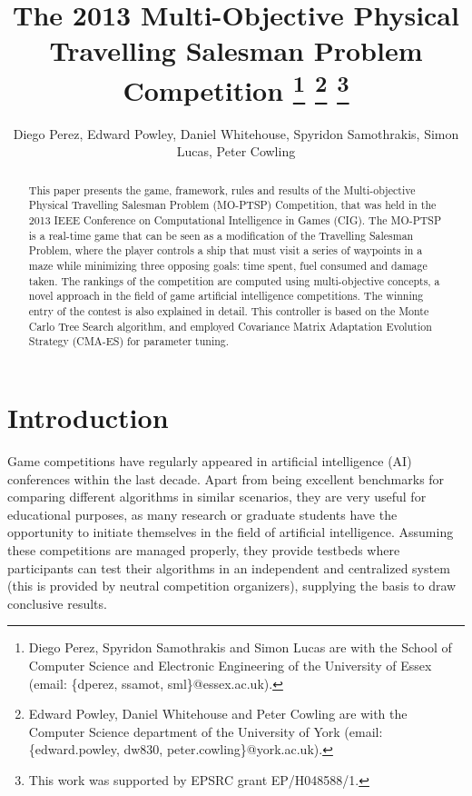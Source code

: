 \documentclass[conference]{IEEEtran}
\begin{document}
\title{The 2013 Multi-Objective Physical Travelling Salesman Problem Competition \thanks{Diego Perez, Spyridon Samothrakis and Simon Lucas are with the School of Computer Science and Electronic Engineering of the University of Essex (email: \{dperez, ssamot, sml\}@essex.ac.uk).} \thanks{Edward Powley, Daniel Whitehouse and Peter Cowling are with the Computer Science department of the University of York (email:  \{edward.powley, dw830, peter.cowling\}@york.ac.uk).} \thanks{This work was supported by EPSRC grant EP/H048588/1.}}

\author{Diego Perez, Edward Powley, Daniel Whitehouse, Spyridon Samothrakis, Simon Lucas, Peter Cowling}


\maketitle

\begin{abstract}
This paper presents the game, framework, rules and results of the Multi-objective Physical Travelling Salesman Problem (MO-PTSP) Competition, that was held in the 2013 IEEE Conference on Computational Intelligence in Games (CIG). The MO-PTSP is a real-time game that can be seen as a modification of the Travelling Salesman Problem, where the player controls a ship that must visit a series of waypoints in a maze while minimizing three opposing goals: time spent, fuel consumed and damage taken. The rankings of the competition are computed using multi-objective concepts, a novel approach in the field of game artificial intelligence competitions. The winning entry of the contest is also explained in detail. This controller is based on the Monte Carlo Tree Search algorithm, and employed Covariance Matrix Adaptation Evolution Strategy (CMA-ES) for parameter tuning. 
\end{abstract}


\section{Introduction}

Game competitions have regularly appeared in artificial intelligence (AI) conferences within the last decade. Apart from being excellent benchmarks for comparing different algorithms in similar scenarios, they are very useful for educational purposes, as many research or graduate students have the opportunity to initiate themselves in the field of artificial intelligence. Assuming these competitions are managed properly, they provide testbeds where participants can test their algorithms in an independent and centralized system (this is provided by neutral competition organizers), supplying the basis to draw conclusive results.
\end{document}
